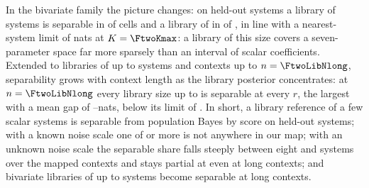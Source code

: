 \begin{table}[t]
\centering\small

\caption{Held-out systems, library versus population Bayes: percentage of (cell, library draw) pairs whose lower bound
(estimate $-\,3\,$SE) reaches $\delta$, by library size $K$ (blank: size not mapped), pooled over each map's own grid of
context lengths. Noisy family at $h=1$. Generated from the pinned map files.}
\label{tab:library}
\end{table}

In the bivariate family the picture changes: on held-out systems a library of \KSixteen systems is
separable in \FtwoLibSixteen of \FtwoLibCells cells and a library of \FtwoKmax in \FtwoLibSixtyFour of \FtwoLibCells, in line
with a nearest-system limit of \NaTwoSixtyFour nats at $K=\FtwoKmax$: a library of this size covers a seven-parameter space
far more sparsely than an interval of scalar coefficients. Extended to libraries of up to \KThousand systems and contexts up
to $n=\FtwoLibNlong$, separability grows with context length as the library posterior concentrates: at $n=\FtwoLibNlong$
every library size up to \KThousand is separable at every $r$, the largest with a mean gap of
\FtwoLibThousandMin--\FtwoLibThousandMax nats, below its limit of \NaTwoThousand. In short, a library reference of a few
scalar systems is separable from population Bayes by score on held-out systems; with a known noise scale one of
\LibBigKOneA or more is not anywhere in our map; with an unknown noise scale the separable share falls steeply between eight
and \KSixteen systems over the mapped contexts and stays partial at \KSixteen even at long contexts; and bivariate libraries
of up to \KThousand systems become separable at long contexts.
